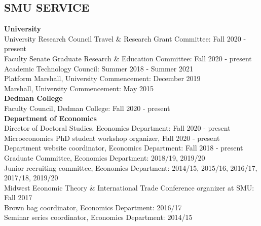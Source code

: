 \documentclass[11pt]{res}
\begin{document}
\begin{resume}
\section{SMU SERVICE} \vspace{1.5mm}
\textbf{University}\vspace{1.5mm}\\
University Research Council Travel \& Research Grant Committee: Fall 2020 - present\vspace{1.5mm}\\
Faculty Senate Graduate Research \& Education Committee: Fall 2020 - present\vspace{1.5mm}\\
Academic Technology Council: Summer 2018 - Summer 2021\vspace{1.5mm}\\
Platform Marshall, University Commencement: December 2019\vspace{1.5mm}\\
Marshall, University Commencement: May 2015\vspace{4mm}\\
\textbf{Dedman College}\vspace{1.5mm}\\
Faculty Council, Dedman College: Fall 2020 - present\vspace{4mm}\\
\textbf{Department of Economics}\vspace{1.5mm}\\
Director of Doctoral Studies, Economics Department: Fall 2020 - present\vspace{1.5mm}\\
Microeconomics PhD student workshop organizer, Fall 2020 - present\vspace{1.5mm}\\
Department website coordinator, Economics Department: Fall 2018 - present\vspace{1.5mm}\\
Graduate Committee, Economics Department: 2018/19, 2019/20\vspace{1.5mm}\\
Junior recruiting committee, Economics Department: 2014/15, 2015/16, 2016/17, 2017/18, 2019/20\vspace{1.5mm}\\
Midwest Economic Theory \& International Trade Conference organizer at SMU: Fall 2017\vspace{1.5mm}\\
Brown bag coordinator, Economics Department: 2016/17\vspace{1.5mm}\\
Seminar series coordinator, Economics Department: 2014/15

\end{resume}
\end{document}
